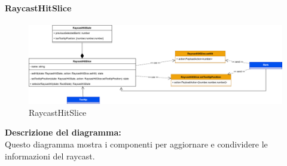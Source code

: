 \paragraph{RaycastHitSlice}
\begin{figure}[h!] \centering
    \includegraphics[scale=0.20]{template/images/uml_front/logic/RaycastHitSlice.png}
    \caption{RaycastHitSlice}
\end{figure}
\textbf{Descrizione del diagramma:}\\
Questo diagramma mostra i componenti per aggiornare e condividere le informazioni del raycast.
